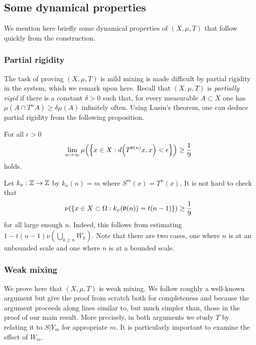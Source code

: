 \documentclass[AHL,Unicode,longabstracts,published]{cedram}
\DeclareMathOperator{\p}{\mathsf{p}}
\newcommand{\Z}{\mathbb{Z}}
\let\originalleft\left
\let\originalright\right
\renewcommand{\left}{\mathopen{}\mathclose\bgroup\originalleft}
\renewcommand{\right}{\aftergroup\egroup\originalright}
\renewcommand*{\to}{\mathchoice{\longrightarrow}{\rightarrow}{\rightarrow}{\rightarrow}}
\begin{document}
\subsection{Some dynamical properties}

We mention here briefly some dynamical properties of $(X,\mu,T)$ that follow quickly from the construction.

\subsubsection{Partial rigidity} The task of proving $(X,\mu,T)$ is mild mixing is made difficult by partial rigidity in the system, which we remark upon here. Recall that $(X,\mu,T)$ is
\emph{partially rigid} if there is a constant $\delta > 0$ such that, for every measurable $A \subset X$ one has $\mu(A \cap T^n A) \ge \delta \mu(A)$ infinitely often. Using Lusin's theorem, one can deduce partial rigidity from the following proposition.

\begin{prop}
For all $\epsilon>0$
\[
\lim_{n \to \infty} \mu\left(\left\{x\in X: d\left(T^{\p(n)}x,x\right)<\epsilon\right\}\right)\geq \frac{1}{9}
\]
holds.
\end{prop}

Let $k_x:\Z \to \Z$ by $k_x(n)=m$ where $S^m(x) = T^{n}(x)$. It is not hard to check that
\[
\nu\left(\left\{x \in X\subset \Omega:k_x(\p(n))=t(n-1)\right\}\right)\geq \frac{1}{9}
\]
for all large enough $n$. Indeed, this follows from estimating $1-t(n-1)\nu(\bigcup_{k\geq n}W_k).$ Note that there are two cases, one where $n$ is at an unbounded scale and one where $n$ is at a bounded scale.


\subsubsection{Weak mixing}\label{subsec:weak_mixing}
We prove here that $(X,\mu,T)$ is weak mixing. We follow roughly a well-known argument but give the proof from scratch both for completeness and because the argument proceeds along lines similar to, but much simpler than, those in the proof of our main result. More precisely, in both arguments we study $T$ by relating it to $S|Y_m$ for appropriate $m$. It is particularly important to examine the effect of $W_m$.
\end{document}
